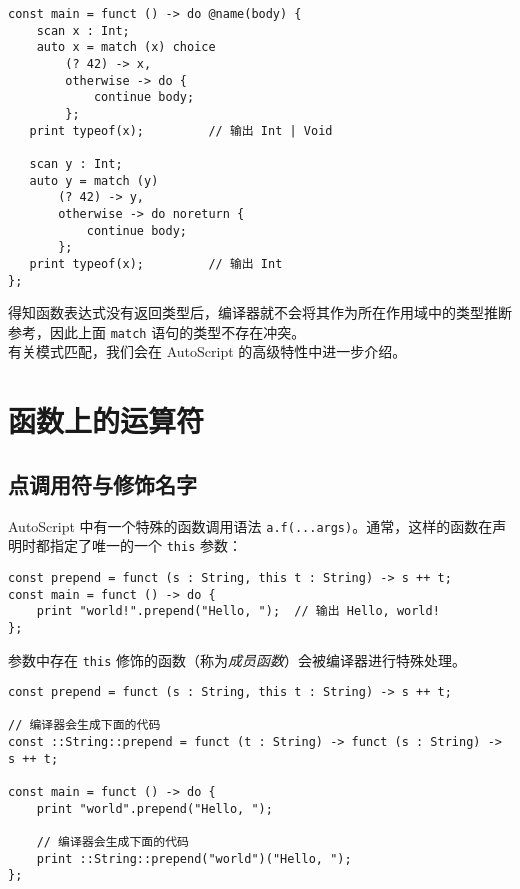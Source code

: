 \begin{lstlisting}
const main = funct () -> do @name(body) {
    scan x : Int;
    auto x = match (x) choice
        (? 42) -> x,
        otherwise -> do {
            continue body;
        };
   print typeof(x);			// 输出 Int | Void
   
   scan y : Int;
   auto y = match (y)
       (? 42) -> y,
       otherwise -> do noreturn {
           continue body;
       };
   print typeof(x);			// 输出 Int
};
\end{lstlisting}

得知函数表达式没有返回类型后，编译器就不会将其作为所在作用域中的类型推断参考，因此上面 \lstinline!match! 语句的类型不存在冲突。 \\

有关模式匹配，我们会在 AutoScript 的高级特性中进一步介绍。



\section{函数上的运算符}

\subsection{点调用符与修饰名字}

AutoScript 中有一个特殊的函数调用语法 \lstinline!a.f(...args)!。通常，这样的函数在声明时都指定了唯一的一个 \lstinline!this! 参数：

\begin{lstlisting}
const prepend = funct (s : String, this t : String) -> s ++ t;
const main = funct () -> do {
    print "world!".prepend("Hello, ");  // 输出 Hello, world!
};
\end{lstlisting}

参数中存在 \lstinline!this! 修饰的函数（称为\emph{成员函数}）会被编译器进行特殊处理。

\begin{lstlisting}
const prepend = funct (s : String, this t : String) -> s ++ t;

// 编译器会生成下面的代码
const ::String::prepend = funct (t : String) -> funct (s : String) -> s ++ t;

const main = funct () -> do {
    print "world".prepend("Hello, ");

    // 编译器会生成下面的代码
    print ::String::prepend("world")("Hello, ");
};
\end{lstlisting}

